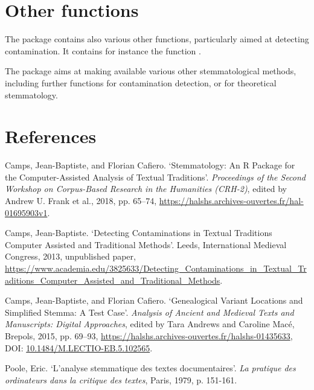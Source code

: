\documentclass[article,nojss]{jss}
\begin{document}
\section{Other functions}
The package contains also various other functions, particularly aimed at
detecting contamination. It contains for instance the function .%

The package aims at making available various other stemmatological methods, including further functions for contamination detection, 
or for theoretical stemmatology.



\section*{References}

Camps, Jean-Baptiste, and Florian Cafiero. ‘Stemmatology: An R Package for the Computer-Assisted Analysis of Textual Traditions’. \emph{Proceedings of the Second Workshop on Corpus-Based Research in the Humanities (CRH-2)}, edited by Andrew U. Frank et al., 2018, pp. 65–74, \url{https://halshs.archives-ouvertes.fr/hal-01695903v1}.

Camps, Jean-Baptiste. ‘Detecting Contaminations in Textual Traditions
Computer Assisted and Traditional Methods’.  Leeds, International Medieval Congress, 2013, unpublished paper, \url{https://www.academia.edu/3825633/Detecting_Contaminations_in_Textual_Traditions_Computer_Assisted_and_Traditional_Methods}.

Camps, Jean-Baptiste, and Florian Cafiero. ‘Genealogical Variant Locations and Simplified Stemma: A Test Case’. \emph{Analysis of Ancient and Medieval Texts and Manuscripts: Digital Approaches}, edited by Tara Andrews and Caroline Macé, Brepols, 2015, pp. 69–93, \url{https://halshs.archives-ouvertes.fr/halshs-01435633}, DOI: \href{http://dx.doi.org/10.1484/M.LECTIO-EB.5.102565}{10.1484/M.LECTIO-EB.5.102565}.

Poole, Eric. ‘L’analyse stemmatique des textes documentaires’. \emph{La pratique des ordinateurs dans la critique des textes}, Paris, 1979, p. 151-161.
\end{document}
